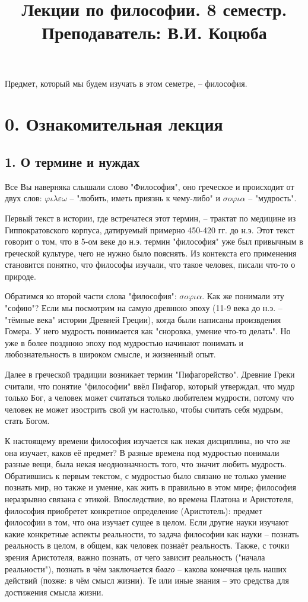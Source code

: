 \documentclass[a4paper, 12pt]{book} %
\title {Лекции по философии. 8 семестр. Преподаватель: В.И. Коцюба}
\begin{document}
\maketitle
\newpage
Предмет, который мы будем изучать в этом семетре, -- философия. 

\section*{0. Ознакомительная лекция}
\subsection*{1. О термине и нуждах}
Все Вы наверняка слышали слово "Философия", оно греческое и происходит от двух слов: $\varphi \iota \lambda \varepsilon \omega $ -- "любить, иметь приязнь к чему-либо" и
 $\sigma o \varphi \iota \alpha$ -- "мудрость".
 
Первый текст в истории, где встречатеся этот  термин, -- трактат по медицине из Гиппократовского корпуса, датируемый примерно 450-420 гг. до н.э. Этот текст говорит о том, что в 5-ом веке до н.э. термин "философия" уже был привычным в греческой культуре, чего не нужно было пояснять. Из контекста его применения становится понятно, что философы изучали, что такое человек, писали что-то о природе. 

Обратимся ко второй части слова "философия": $\sigma o \varphi \iota \alpha$. Как же понимали эту "софию"? Если мы посмотрим на самую древнюю эпоху (11-9 века до н.э. -- "тёмные века" истории Древней Греции), когда были написаны произвдения Гомера. У него мудрость понимается как "сноровка, умение что-то делать". Но уже в более позднюю эпоху под мудростью начинают понимать и любознательность в широком смысле, и жизненный опыт.

Далее в греческой традиции возникает термин "Пифагорейство". Древние Греки считали, что понятие "философии" ввёл Пифагор, который утверждал, что мудр только Бог, а человек может считаться только любителем мудрости, потому что человек не может изострить свой ум настолько, чтобы считать себя мудрым, стать Богом. 

К настоящему времени философия изучается как некая дисциплина, но что же она изучает, каков её предмет? В разные времена под мудростью понимали разные вещи, была некая неоднозначность того, что значит любить мудрость. Обратившись к первым текстом, с мудростью было связано не только умение познать мир, но также и умение, как жить в правильно в этом мире; философия неразрывно связана с этикой. Впоследствие, во времена Платона и Аристотеля, философия приобретет конкретное определение (Аристотель): предмет философии в том, что она изучает сущее в целом. Если другие науки изучают какие конкретные аспекты реальности, то задача философии как науки -- познать реальность в целом, в общем, как человек познаёт реальность. Также, с точки зрения Аристотеля, важно познать, от чего зависит реальность ("начала реальности"), познать в чём заключается \textit{благо} -- какова конечная цель наших действий (позже: в чём смысл жизни). Те или иные знания -- это средства для достижения смысла жизни. 
\end{document}
